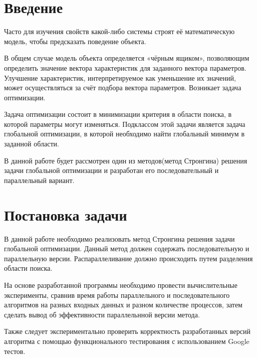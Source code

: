 \documentclass{report}
\begin{document}
\setcounter{page}{2}

\tableofcontents
\newpage

\section*{Введение}
Часто для изучения свойств какой-либо системы строят её математическую модель, чтобы предсказать поведение объекта.
\par
В общем случае модель объекта определяется «чёрным ящиком», позволяющим определить значение вектора характеристик для заданного вектора параметров. Улучшение характеристик, интерпретируемое как уменьшение их значений, может осуществляться за счёт подбора вектора параметров. Возникает задача оптимизации.
\par
Задача оптимизации состоит в минимизации критерия в области поиска, в которой параметры могут изменяться. Подклассом этой задачи является задача глобальной оптимизации, в которой необходимо найти глобальный минимум в заданной области.
\par
В данной работе будет рассмотрен один из методов(метод Стронгина) решения задачи глобальной оптимизации и разработан его последовательный и параллельный вариант.

\newpage

\section*{Постановка задачи}
В данной работе необходимо реализовать метод Стронгина решения задачи глобальной оптимизации. Данный метод должен содержать последовательную и параллельную версии. Распараллеливание должно происходить путем разделения области поиска.
\par
На основе разработанной программы необходимо провести вычислительные эксперименты, сравнив время работы параллельного и последовательного алгоритмов на разных входных данных и разном количестве процессов, затем сделать вывод об эффективности параллельнной версии метода.
\par
Также следует экспериментально проверить корректность разработанных версий алгоритма с помощью функционального тестирования с использованием Google тестов.
\newpage

\end{document}
